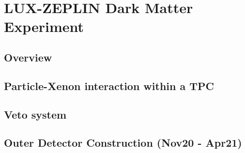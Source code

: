 \chapter{LUX-ZEPLIN Dark Matter Experiment}
\label{chpt:LZ_Exp}
\section{Overview}

\section{Particle-Xenon interaction within a TPC}

\section{Veto system}

\section{Outer Detector Construction (Nov20 - Apr21)}